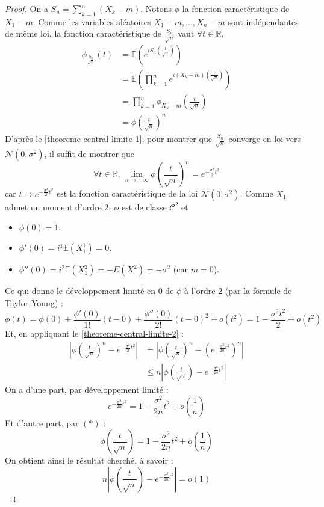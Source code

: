	\begin{proof}
		On a $S_n = \sum_{k=1}^n (X_k - m)$. Notons $\phi$ la fonction caractéristique de $X_1 - m$. Comme les variables aléatoires $X_1 - m, \dots, X_n - m$ sont indépendantes de même loi, la fonction caractéristique de $\frac{S_n}{\sqrt{n}}$ vaut $\forall t \in \mathbb{R}$,
		\begin{align*}
			\phi_{\frac{S_n}{\sqrt{n}}}(t) &= \mathbb{E} \left( e^{iS_n \left( \frac{t}{\sqrt{n}} \right)} \right) \\
			&= \mathbb{E} \left( \prod_{k=1}^n e^{i(X_k -m) \left( \frac{t}{\sqrt{n}} \right)} \right) \\
			&= \prod_{k=1}^n \phi_{X_k - m} \left ( \frac{t}{\sqrt{n}} \right) \\
			&= \phi \left ( \frac{t}{\sqrt{n}} \right)^n
		\end{align*}
		D'après le \cref{theoreme-central-limite-1}, pour montrer que $\frac{S_n}{\sqrt{n}}$ converge en loi vers $\mathcal{N}(0, \sigma^2)$, il suffit de montrer que
		\[ \forall t \in \mathbb{R}, \, \lim_{n \rightarrow +\infty} \phi \left ( \frac{t}{\sqrt{n}} \right)^n = e^{-\frac{\sigma^2}{2} t^2} \]
		car $t \mapsto e^{-\frac{\sigma^2}{2} t^2}$ est la fonction caractéristique de la loi $\mathcal{N}(0, \sigma^2)$.
		\newpar
		Comme $X_1$ admet un moment d'ordre $2$, $\phi$ est de classe $\mathcal{C}^2$ et
		\begin{itemize}
			\item $\phi(0) = 1$.
			\item $\phi'(0) = i^1 \mathbb{E}(X_1^1) = 0$.
			\item $\phi''(0) = i^2 \mathbb{E}(X_1^2) = - E(X^2) = -\sigma^2$ (car $m = 0$).
		\end{itemize}
		Ce qui donne le développement limité en $0$ de $\phi$ à l'ordre $2$ (par la formule de Taylor-Young) :
		\[ \phi(t) = \phi(0) + \frac{\phi'(0)}{1!} (t-0) + \frac{\phi''(0)}{2!} (t-0)^2 + o(t^2) = 1 - \frac{\sigma^2 t^2}{2} + o(t^2) \tag{$*$} \]
		Et, en appliquant le \cref{theoreme-central-limite-2} :
		\begin{align*}
			\left | \phi \left ( \frac{t}{\sqrt{n}} \right)^n - e^{-\frac{\sigma^2}{2} t^2} \right | &= \left | \phi \left ( \frac{t}{\sqrt{n}} \right)^n - \left( e^{- \frac{\sigma^2}{2n} t^2} \right)^n \right | \\
			&\leq n \left | \phi \left ( \frac{t}{\sqrt{n}} \right) - e^{-\frac{\sigma^2}{2n} t^2} \right |
		\end{align*}
		\[  \]
		On a d'une part, par développement limité :
		\[ e^{-\frac{\sigma^2}{2n} t^2} = 1 - \frac{\sigma^2}{2n} t^2 + o \left ( \frac{1}{n} \right) \]
		Et d'autre part, par $(*)$ :
		\[ \phi \left ( \frac{t}{\sqrt{n}} \right) = 1 - \frac{\sigma^2}{2n}t^2 + o \left ( \frac{1}{n} \right ) \]
		On obtient ainsi le résultat cherché, à savoir :
		\[ n \left | \phi \left ( \frac{t}{\sqrt{n}} \right) - e^{-\frac{\sigma^2}{2n} t^2} \right | = o (1) \]
	\end{proof}

